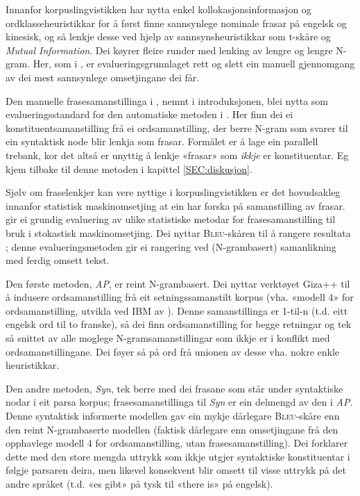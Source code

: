 \documentclass[12pt,a4paper,oneside,draft]{report}
\newcommand{\Bleu}{\textsc{Bleu}}
\begin{document}
Innanfor korpuslingvistikken har \citet{piao2001mwu} nytta enkel
 kollokasjonsinformasjon og ordklasseheuristikkar for å først finne
 sannsynlege nominale frasar på engelsk og kinesisk, og så lenkje
 desse ved hjelp av sannsynsheuristikkar som t-skåre og \emph{Mutual  Information}. Dei køyrer fleire runder med lenking av lengre og
 lengre N-gram.  Her, som i \citet{kupiec1993afn}, er
 evalueringsgrunnlaget rett og slett ein manuell gjennomgang av dei
 mest sannsynlege omsetjingane dei får.

Den manuelle frasesamanstillinga i \citet{samuelsson2006pap}, nemnt i
 introduksjonen, blei nytta som evalueringsstandard for den
 automatiske metoden i \citet{samuelsson2007apa}.  Her finn dei ei
 konstituentsamanstilling frå ei ordsamanstilling, der berre N-gram
 som svarer til ein syntaktisk node blir lenkja som frasar. Formålet
 er å lage ein parallell trebank, kor det altså er unyttig å lenkje
 «frasar» som \emph{ikkje} er konstituentar. Eg kjem tilbake til denne
 metoden i kapittel \ref{SEC:diskusjon}.

Sjølv om fraselenkjer kan vere nyttige i korpuslingvistikken er det
 hovudsakleg innanfor statistisk maskinomsetjing at ein har forska på
 samanstilling av frasar. \citet{koehn2003spb} gir ei grundig
 evaluering av ulike statistiske metodar for frasesamanstilling til
 bruk i stokastisk maskinomsetjing. Dei nyttar \Bleu-skåren til å
 rangere resultata
 \citep[Papineni~et~al.,~2001,~i][s.~51]{koehn2003spb}; denne
 evalueringsmetoden gir ei rangering ved (N-grambasert) samanlikning
 med ferdig omsett tekst.

Den første metoden, \emph{AP}, er reint N-grambasert. Dei nyttar verktøyet
 Giza++ \citep[Och og Ney, 2000, i][s.~50]{koehn2003spb} til å
 indusere ordsamanstilling frå eit setningssamanstilt korpus
 (vha. «modell 4» for ordsamanstilling, utvikla ved IBM av
 \citet{brown1993msm}). Denne samanstillinga er 1-til-n (t.d. eitt
 engelsk ord til to franske), så dei finn ordsamanstilling for begge
 retningar og tek så snittet av alle moglege N-gramsamanstillingar som
 ikkje er i konflikt med ordsamanstillingane. Dei føyer så på ord frå
 unionen av desse vha. nokre enkle heuristikkar.

Den andre metoden, \emph{Syn}, tek berre med dei frasane som står under
 syntaktiske nodar i eit parsa korpus; frasesamanstillinga til \emph{Syn}
 er ein delmengd av den i \emph{AP}. Denne syntaktisk informerte modellen
 gav ein mykje dårlegare \Bleu-skåre enn den reint N-grambaserte
 modellen (faktisk dårlegare enn omsetjingane frå den opphavlege
 modell 4 for ordsamanstilling, utan frasesamanstilling). Dei
 forklarer dette med den store mengda uttrykk som ikkje utgjer
 syntaktiske konstituentar i følgje parsaren deira, men likevel
 konsekvent blir omsett til visse uttrykk på det andre språket
 (t.d. «es gibt» på tysk til «there is» på engelsk).
\end{document}
